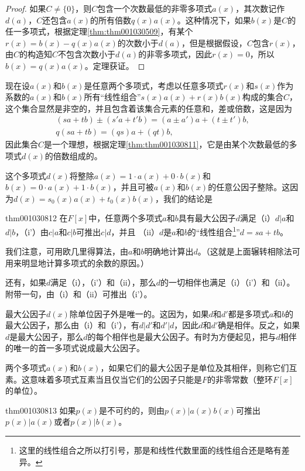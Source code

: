 \begin{proof}
如果$C \neq \{0\}$，则$C$包含一个次数最低的非零多项式$a(x)$，其次数记作$d(a)$，$C$还包含$a(x)$的所有倍数$q(x)a(x)$。这种情况下，如果$b(x)$是$C$的任一多项式，根据定理\ref{thm:thm001030509}，有某个$r(x)=b(x)-q(x)a(x)$的次数小于$d(a)$，但是根据假设，$C$包含$r(x)$，由$C$的构造知$C$不包含次数小于$d(a)$的非零多项式，因此$r(x)=0$，所以$b(x)=q(x)a(x)$。定理获证。
\end{proof}

现在设$a(x)$和$b(x)$是任意两个多项式，考虑以任意多项式$r(x)$和$s(x)$作为系数的$a(x)$和$b(x)$所有“线性组合”$s(x)a(x)+r(x)b(x)$构成的集合$C$，这个集合显然是非空的，并且包含着该集合元素的任意和，差或倍数，这是因为
\begin{gather*}
(sa+tb) \pm (s'a+t'b) = (a \pm a')a+(t \pm t')b,\\
q(sa+tb) = (qs)a + (qt)b,
\end{gather*}
因此集合$C$是一个理想，根据定理\ref{thm:thm001030811}，它是由某个次数最低的多项式$d(x)$的倍数组成的。

这个多项式$d(x)$将整除$a(x) = 1 \cdot a(x) + 0 \cdot b(x)$和$b(x) = 0 \cdot a(x) + 1\cdot b(x)$，并且可被$a(x)$和$b(x)$的任意公因子整除。这因为$d(x)=s_0(x)a(x)+t_0(x)b(x)$，我们的结论是
\begin{theorem}{}{thm001030812}
在$F[x]$中，任意两个多项式$a$和$b$具有最大公因子$d$满足（i）$d|a$和$d|b$，（i'）由$c|a$和$c|b$可推出$c|d$，并且 （ii）$d$是$a$和$b$的“线性组合\footnote{这里的线性组合之所以打引号，那是和线性代数里面的线性组合还是略有差异。}”$d=sa+tb$。
\end{theorem}

我们注意，可用欧几里得算法，由$a$和$b$明确地计算出$d$。（这就是上面辗转相除法可用来明显地计算多项式的余数的原因。）

还有，如果$d$满足（i），（i'）和（ii），那么$d$的一切相伴也满足（i）（i'）和（ii）。附带一句，由（i）和（ii）可推出（i'）。

最大公因子$d(x)$除单位因子外是唯一的。这因为，如果$d$和$d'$都是多项式$a$和$b$的最大公因子，那么由（i）和（i'），有$d|d'$和$d'|d$，因此$d$和$d'$确是相伴。反之，如果$d$是最大公因子，那么$d$的每个相伴也是最大公因子。有时为方便起见，把与$d$相伴的唯一的首一多项式说成最大公因子。

两个多项式$a(x)$和$b(x)$，如果它们的最大公因子是单位及其相伴，则称它们互素。这意味着多项式互素当且仅当它们的公因子只能是$F$的非零常数（整环$F[x]$的单位）。

\begin{theorem}{}{thm001030813}
如果$p(x)$是不可约的，则由$p(x)|a(x)b(x)$可推出$p(x)|a(x)$或者$p(x)|b(x)$。
\end{theorem}

